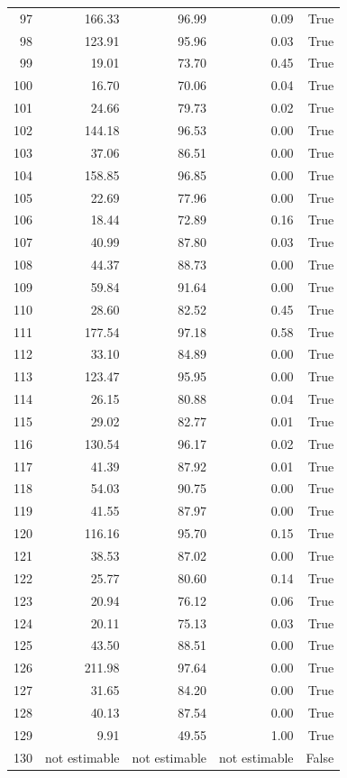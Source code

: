 \begin{longtable}{rrrrr}
97 & 166.33 & 96.99 & 0.09 & True \\
98 & 123.91 & 95.96 & 0.03 & True \\
99 & 19.01 & 73.70 & 0.45 & True \\
100 & 16.70 & 70.06 & 0.04 & True \\
101 & 24.66 & 79.73 & 0.02 & True \\
102 & 144.18 & 96.53 & 0.00 & True \\
103 & 37.06 & 86.51 & 0.00 & True \\
104 & 158.85 & 96.85 & 0.00 & True \\
105 & 22.69 & 77.96 & 0.00 & True \\
106 & 18.44 & 72.89 & 0.16 & True \\
107 & 40.99 & 87.80 & 0.03 & True \\
108 & 44.37 & 88.73 & 0.00 & True \\
109 & 59.84 & 91.64 & 0.00 & True \\
110 & 28.60 & 82.52 & 0.45 & True \\
111 & 177.54 & 97.18 & 0.58 & True \\
112 & 33.10 & 84.89 & 0.00 & True \\
113 & 123.47 & 95.95 & 0.00 & True \\
114 & 26.15 & 80.88 & 0.04 & True \\
115 & 29.02 & 82.77 & 0.01 & True \\
116 & 130.54 & 96.17 & 0.02 & True \\
117 & 41.39 & 87.92 & 0.01 & True \\
118 & 54.03 & 90.75 & 0.00 & True \\
119 & 41.55 & 87.97 & 0.00 & True \\
120 & 116.16 & 95.70 & 0.15 & True \\
121 & 38.53 & 87.02 & 0.00 & True \\
122 & 25.77 & 80.60 & 0.14 & True \\
123 & 20.94 & 76.12 & 0.06 & True \\
124 & 20.11 & 75.13 & 0.03 & True \\
125 & 43.50 & 88.51 & 0.00 & True \\
126 & 211.98 & 97.64 & 0.00 & True \\
127 & 31.65 & 84.20 & 0.00 & True \\
128 & 40.13 & 87.54 & 0.00 & True \\
129 & 9.91 & 49.55 & 1.00 & True \\
130 & not estimable & not estimable & not estimable & False \\

\end{longtable}
